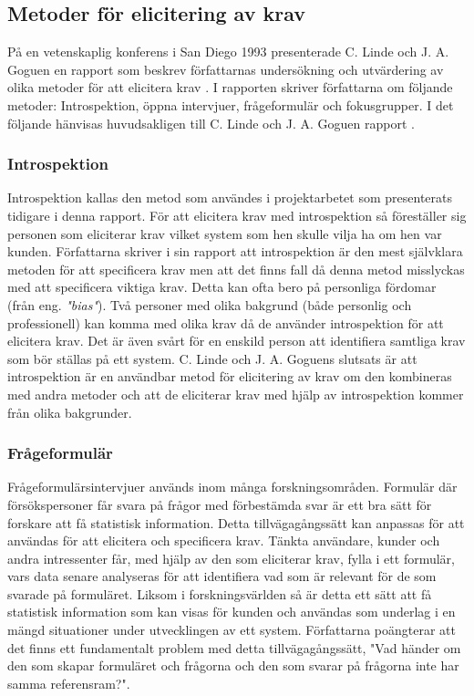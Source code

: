 \subsection{Metoder för elicitering av krav}
På en vetenskaplig konferens i San Diego 1993 presenterade C. Linde och J. A. Goguen en rapport som beskrev författarnas undersökning och utvärdering av olika metoder för att elicitera krav \cite{goguen1993techniques}. I rapporten skriver författarna om följande metoder: Introspektion, öppna intervjuer, frågeformulär och fokusgrupper. I det följande hänvisas huvudsakligen till C. Linde och J. A. Goguen rapport \cite{goguen1993techniques}. 

\subsubsection{Introspektion}
Introspektion kallas den metod som användes i projektarbetet som presenterats tidigare i denna rapport. För att elicitera krav med introspektion så föreställer sig personen som eliciterar krav vilket system som hen skulle vilja ha om hen var kunden. Författarna skriver i sin rapport att introspektion är den mest självklara metoden för att specificera krav men att det finns fall då denna metod misslyckas med att specificera viktiga krav. Detta kan ofta bero på personliga fördomar (från eng. \textit{"bias"}). Två personer med olika bakgrund (både personlig och professionell) kan komma med olika krav då de använder introspektion för att elicitera krav. Det är även svårt för en enskild person att identifiera samtliga krav som bör ställas på ett system.  C. Linde och J. A. Goguens slutsats är att introspektion är en användbar metod för elicitering av krav om den kombineras med andra metoder och att de eliciterar krav med hjälp av introspektion kommer från olika bakgrunder. 

\subsubsection{Frågeformulär}
Frågeformulärsintervjuer används inom många forskningsområden. Formulär där försökspersoner får svara på frågor med förbestämda svar är ett bra sätt för forskare att få statistisk information. Detta tillvägagångssätt kan anpassas för att användas för att elicitera och specificera krav. Tänkta användare, kunder och andra intressenter får, med hjälp av den som eliciterar krav, fylla i ett formulär, vars data senare analyseras för att identifiera vad som är relevant för de som svarade på formuläret. Liksom i forskningsvärlden så är detta ett sätt att få statistisk information som kan visas för kunden och användas som underlag i en mängd situationer under utvecklingen av ett system. Författarna poängterar att det finns ett fundamentalt problem med detta tillvägagångssätt, "Vad händer om den som skapar formuläret och frågorna och den som svarar på frågorna inte har samma referensram?".
 
